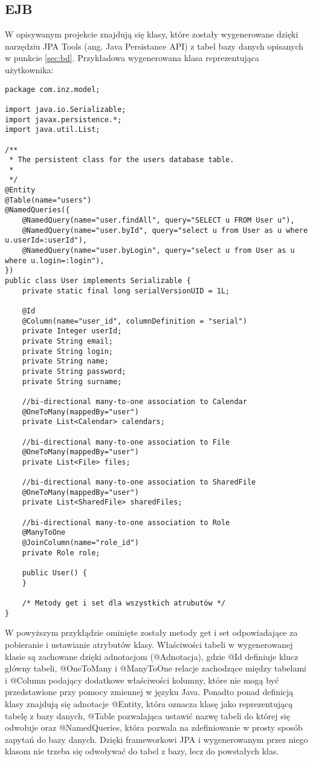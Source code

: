 \subsection{EJB}
\label{subsec:ejb}
W opisywanym projekcie znajdują się klasy, które zostały wygenerowane dzięki narzędziu JPA Tools (ang. Java Persistance API) z tabel bazy danych opisanych w punkcie \ref{sec:bd}. Przykładowa wygenerowana klasa reprezentująca użytkownika:
\begin{lstlisting}
package com.inz.model;

import java.io.Serializable;
import javax.persistence.*;
import java.util.List;

/**
 * The persistent class for the users database table.
 * 
 */
@Entity
@Table(name="users")
@NamedQueries({
	@NamedQuery(name="user.findAll", query="SELECT u FROM User u"),
	@NamedQuery(name="user.byId", query="select u from User as u where u.userId=:userId"),
	@NamedQuery(name="user.byLogin", query="select u from User as u where u.login=:login"),
})
public class User implements Serializable {
	private static final long serialVersionUID = 1L;

	@Id
	@Column(name="user_id", columnDefinition = "serial")
	private Integer userId;
	private String email;
	private String login;
	private String name;
	private String password;
	private String surname;

	//bi-directional many-to-one association to Calendar
	@OneToMany(mappedBy="user")
	private List<Calendar> calendars;

	//bi-directional many-to-one association to File
	@OneToMany(mappedBy="user")
	private List<File> files;

	//bi-directional many-to-one association to SharedFile
	@OneToMany(mappedBy="user")
	private List<SharedFile> sharedFiles;

	//bi-directional many-to-one association to Role
	@ManyToOne
	@JoinColumn(name="role_id")
	private Role role;

	public User() {
	}

	/* Metody get i set dla wszystkich atrubutów */
}
\end{lstlisting}

W powyższym przykłądzie ominięte zostały metody get i set odpowiadające za pobieranie i ustawianie atrybutów klasy. Właściwości tabeli w wygenerowanej klasie są zachowane dzięki adnotacjom (@Adnotacja), gdzie @Id definiuje klucz główny tabeli, @OneToMany i @ManyToOne relacje zachodzące między tabelami i @Column podający dodatkowe właściwości kolumny, które nie mogą być przedstawione przy pomocy zmiennej w języku Java. Ponadto ponad definicją klasy znajdują się adnotacje @Entity, która oznacza klasę jako reprezentującą tabelę z bazy danych, @Table pozwalająca ustawić nazwę tabeli do której się odwołuje oraz @NamedQueries, która pozwala na zdefiniowanie w prosty sposób zapytań do bazy danych. Dzięki frameworkowi JPA i wygenerowanym przez niego klasom nie trzeba się odwoływać do tabel z bazy, lecz do powstałych klas.

